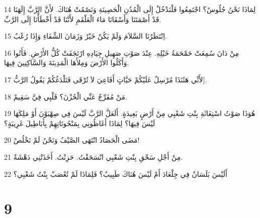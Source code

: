 \par 14 لِمَاذَا نَحْنُ جُلُوسٌ؟ اجْتَمِعُوا فَلْنَدْخُلْ إِلَى الْمُدُنِ الْحَصِينَةِ وَنَصْمُتْ هُنَاكَ. لأَنَّ الرَّبَّ إِلَهَنَا قَدْ أَصْمَتَنَا وَأَسْقَانَا مَاءَ الْعَلْقَمِ لأَنَّنَا قَدْ أَخْطَأْنَا إِلَى الرَّبِّ.
\par 15 اِنْتَظَرْنَا السَّلاَمَ وَلَمْ يَكُنْ خَيْرٌ وَزَمَانَ الشِّفَاءِ وَإِذَا رُعْبٌ.
\par 16 مِنْ دَانَ سُمِعَتْ حَمْحَمَةُ خَيْلِهِ. عِنْدَ صَوْتِ صَهِيلِ جِيَادِهِ ارْتَجَفَتْ كُلُّ الأَرْضِ. فَأَتُوا وَأَكَلُوا الأَرْضَ وَمِلأَهَا الْمَدِينَةَ وَالسَّاكِنِينَ فِيهَا.
\par 17 لأَنِّي هَئَنَذَا مُرْسِلٌ عَلَيْكُمْ حَيَّاتٍ أَفَاعِيَ لاَ تُرْقَى فَتَلْدَغُكُمْ يَقُولُ الرَّبُّ].
\par 18 مَنْ مُفَرِّجٌ عَنِّي الْحُزْنَ؟ قَلْبِي فِيَّ سَقِيمٌ.
\par 19 هُوَذَا صَوْتُ اسْتِغَاثَةِ بِنْتِ شَعْبِي مِنْ أَرْضٍ بَعِيدَةٍ. أَلَعَلَّ الرَّبَّ لَيْسَ فِي صِهْيَوْنَ أَوْ مَلِكَهَا لَيْسَ فِيهَا؟ لِمَاذَا أَغَاظُونِي بِمَنْحُوتَاتِهِمْ بِأَبَاطِيلَ غَرِيبَةٍ؟
\par 20 مَضَى الْحَصَادُ انْتَهَى الصَّيْفُ وَنَحْنُ لَمْ نَخْلُصْ!
\par 21 مِنْ أَجْلِ سَحْقِ بِنْتِ شَعْبِي انْسَحَقْتُ. حَزِنْتُ. أَخَذَتْنِي دَهْشَةٌ.
\par 22 أَلَيْسَ بَلَسَانٌ فِي جِلْعَادَ أَمْ لَيْسَ هُنَاكَ طَبِيبٌ؟ فَلِمَاذَا لَمْ تُعْصَبْ بِنْتُ شَعْبِي؟

\chapter{9}

